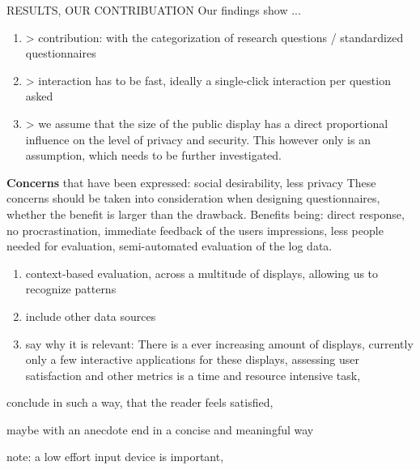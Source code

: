 	RESULTS, OUR CONTRIBUATION
	Our findings show ...
	\begin{enumerate}
	\item > contribution: with the categorization of research questions / standardized questionnaires
	\item > interaction has to be fast, ideally a single-click interaction per question asked
	\item > we assume that the size of the public display has a direct proportional influence on the level of privacy and security. This however only is an assumption, which needs to be further investigated.
	\end{enumerate}

	\textbf{Concerns} that have been expressed: social desirability, less privacy
	These concerns should be taken into consideration when designing questionnaires, whether the benefit is larger than the drawback. Benefits being: direct response, no procrastination, immediate feedback of the users impressions, less people needed for evaluation, semi-automated evaluation of the log data.



	\begin{enumerate}
	\item context-based evaluation, across a multitude of displays, allowing us to recognize patterns
	\item include other data sources
	\item say why it is relevant: There is a ever increasing amount of displays, currently only a few interactive applications for these displays, assessing user satisfaction and other metrics is a time and resource intensive task, 
	\end{enumerate}

	conclude in such a way, that the reader feels satisfied, 

	maybe with an anecdote
	end in a concise and meaningful way




	note: a low effort input device is important,

